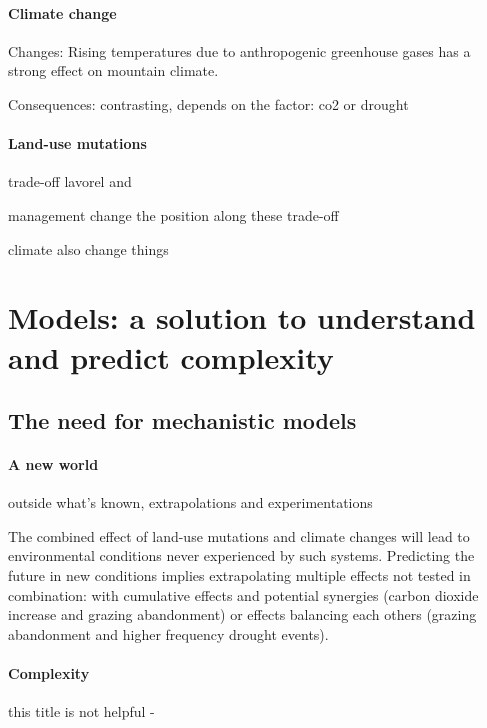 \paragraph{Climate change}
Changes:
Rising temperatures due to anthropogenic greenhouse gases has a strong effect on mountain climate. 

Consequences: contrasting, depends on the factor: co2 or drought

\paragraph{Land-use mutations}

trade-off lavorel and \parencite{schirpke_multiple_2012}

management change the position along these trade-off

climate also change things



 
%
\section{Models: a solution to understand and predict complexity}

\subsection{The need for mechanistic models}

\paragraph{A new world}
outside what's known, extrapolations and experimentations

The combined effect of land-use mutations and climate changes will lead to environmental conditions never experienced by such systems. Predicting the future in new conditions implies extrapolating multiple effects not tested in combination: with cumulative effects and potential synergies (carbon dioxide increase and grazing abandonment) or effects balancing each others (grazing abandonment and higher frequency drought events).


 \paragraph{Complexity}
 this title is not helpful -
 
